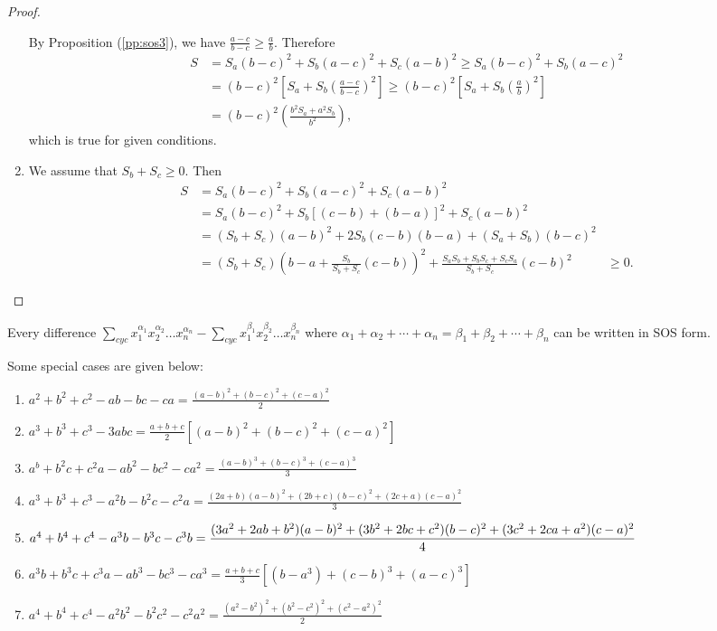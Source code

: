 \begin{proof}
\begin{enumerate}
      \noindent By Proposition (\ref{pp:sos3}), we have $\frac{a - c}{b - c}\geq
      \frac{a}{b}$. Therefore
      $$\begin{aligned}S &= S_a(b - c)^2 + S_b(a - c)^2 + S_c(a - b)^2\geq S_a(b
        - c)^2 + S_b(a - c)^2\\&=(b - c)^2\left[S_a + S_b\left(\frac{a - c}{b -
            c}\right)^2\right]\geq (b - c)^2\left[S_a +
          S_b\left(\frac{a}{b}\right)^2\right]\\& = (b - c)^2\left(\frac{b^2S_a
          + a^2S_b}{b^2}\right),\end{aligned}$$
      which is true for given conditions.
    \item We assume that $S_b + S_c\geq 0$. Then
      $$\begin{aligned}S & = S_a(b - c)^2 + S_b(a - c)^2 + S_c(a - b)^2\\&=
      S_a(b - c)^2 +
      S_b[(c - b) + (b - a)]^2 + S_c(a - b)^2\\&= (S_b + S_c)(a - b)^2 + 2S_b(c
      - b)(b - a) + (S_a + S_b)(b - c)^2\\&=(S_b + S_c)\left(b - a +
      \frac{S_b}{S_b + S_c}(c - b)\right)^2 + \frac{S_aS_b + S_bS_c+ S_cS_a}{S_b
      + S_c}(c - b)^2&\geq 0.\end{aligned}$$
  \end{enumerate}
\end{proof}

Every difference $\sum_{cyc}x_1^{\alpha_1}x_2^{\alpha_2}\ldots x_n^{\alpha_n} -
\sum_{cyc}x_1^{\beta_1}x_2^{\beta_2}\ldots x_n^{\beta_n}$ where $\alpha_1 +
\alpha_2 + \cdots + \alpha_n = \beta_1 + \beta_2 + \cdots + \beta_n$ can be
written in SOS form.

Some special cases are given below:

\begin{enumerate}
  \item $a^2 + b^2 + c^2 - ab - bc - ca = \frac{(a - b)^2 + (b - c)^2 + (c -
    a)^2}{2}$
  \item $a^3 + b^3 + c^3 - 3abc = \frac{a + b + c}{2}\left[(a - b)^2 + (b - c)^2
    + (c - a)^2\right]$
  \item $a^b + b^2c + c^2a - ab^2 - bc^2 - ca^2 = \frac{(a - b)^3 + (b - c)^3 + (c -
    a)^3}{3}$
  \item $a^3 + b^3 + c^3 - a^2b - b^2c - c^2a = \frac{(2a + b)(a - b)^2 + (2b +
    c)(b - c)^2 + (2c + a)(c - a)^2}{3}$
  \item $a^4 + b^4 + c^4 - a^3b - b^3c - c^3b = \\\\\frac{(3a^2 + 2ab + b^2)(a -
    b)^2 + (3b^2 + 2bc + c^2)(b - c)^2 + (3c^2 + 2ca + a^2)(c - a)^2}{4}$
  \item $a^3b + b^3c + c^3a - ab^3 - bc^3 - ca^3 = \frac{a + b + c}{3}\left[(b -
    a^3) + (c - b)^3 + (a - c)^3\right]$
  \item $a^4 + b^4 + c^4 - a^2b^2 - b^2c^2 - c^2a^2 = \frac{(a^2 - b^2)^2 + (b^2
    - c^2)^2 + (c^2 - a^2)^2}{2}$
\end{enumerate}

